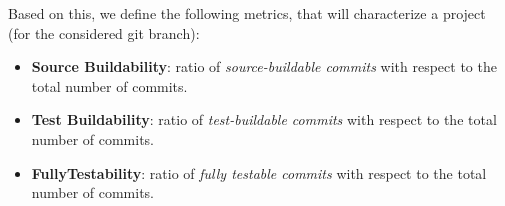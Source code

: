 Based on this, we define the following metrics, that will characterize a project (for the considered git branch):
\begin{itemize}
    \item \textbf{Source Buildability}: ratio of \textit{source-buildable commits} with respect to the total number of commits.
    \item \textbf{Test Buildability}: ratio of \textit{test-buildable commits} with respect to the total number of commits.
    \item \textbf{FullyTestability}: ratio of \textit{fully testable commits} with respect to the total number of commits.
\end{itemize}


